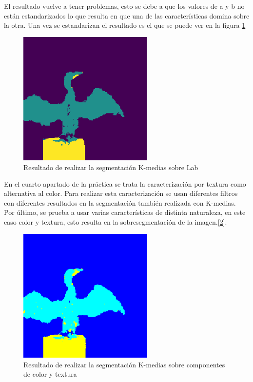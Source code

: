 \documentclass[a4paper,12pt]{report}
\begin{document}
El resultado vuelve a tener problemas, esto se debe a que los valores de a y b no están estandarizados lo que resulta en que una de las características domina sobre la otra. Una vez se estandarizan el resultado es el que se puede ver en la figura \ref{segmentacionlab}\\


\begin{figure}[h]
\centering
\includegraphics[width=0.6\textwidth]{imagenes/segmentacionlab}
\caption{Resultado de realizar la segmentación K-medias sobre Lab}
\label{segmentacionlab}
\end{figure}

En el cuarto apartado de la práctica se trata la caracterización por textura como alternativa al color. Para realizar esta caracterización se usan diferentes filtros con diferentes resultados en la segmentación también realizada con K-medias.\\

Por último, se prueba a usar varias características de distinta naturaleza, en este caso color y textura, esto resulta en la sobresegmentación de la imagen.[\ref{segmentacionabe}].

\begin{figure}[h]
\centering
\includegraphics[width=0.6\textwidth]{imagenes/segmentacionabe}
\caption{Resultado de realizar la segmentación K-medias sobre componentes de color y textura}
\label{segmentacionabe}
\end{figure}
\end{document}
